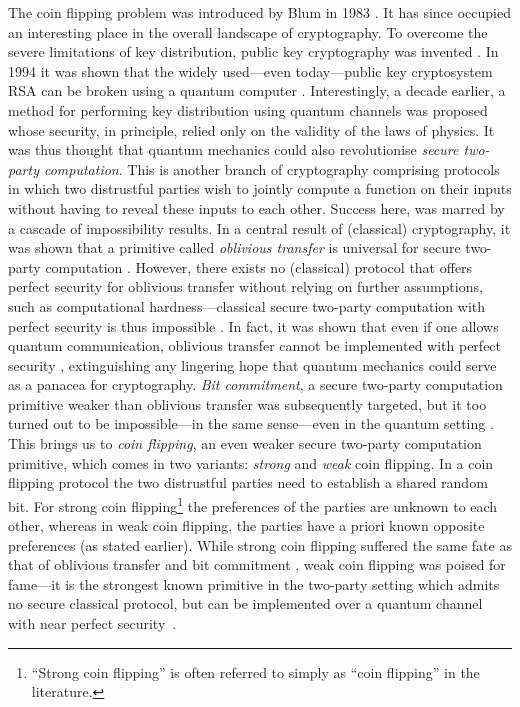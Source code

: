 \documentclass{article}
\begin{document}
%
The coin flipping problem was introduced by Blum in 1983 \cite{Blum:1983:CFT:1008908.1008911}. It has since occupied an interesting place in the overall landscape
of cryptography. To overcome the severe limitations of key distribution, public key cryptography was invented \cite{DH,Merkel}. In 1994 it was shown that the widely used---even today---public key cryptosystem RSA \cite{RSA} can be broken using a quantum computer \cite{Shora}.
Interestingly, a decade earlier, a method for performing key distribution using quantum channels
\cite{BB84} was proposed whose security, in principle, relied only
on the validity of the laws of physics. It was thus thought that quantum mechanics could also revolutionise
\emph{secure two-party computation}. This is another branch of cryptography comprising protocols in which two distrustful parties wish to jointly compute a function on their inputs without having to reveal these inputs to each other. Success here, was marred by a cascade of impossibility results. In a central result of (classical) cryptography, it was shown that a primitive called \emph{oblivious transfer} is universal for secure two-party computation \cite{Kilian}. However, there exists no (classical) protocol that offers perfect security for oblivious transfer without relying on further assumptions,
such as computational hardness---classical secure two-party computation with perfect security is thus impossible \cite{Colbeck07}. In fact, it was shown that even if one allows quantum communication, oblivious transfer cannot be implemented with perfect security \cite{Lo97,CKS13}, extinguishing any lingering hope that quantum mechanics could serve as a panacea for cryptography.
%
%
%
%
%
%
\emph{Bit commitment}, a secure two-party computation primitive weaker than oblivious transfer was subsequently targeted, but it too turned out to be impossible---in the same sense---even in the quantum setting \cite{CK11}. This brings us to \emph{coin flipping}, an even weaker secure two-party computation primitive, which comes in two variants: \emph{strong} and \emph{weak} coin flipping. In a coin flipping protocol the two distrustful parties need to establish a shared random bit. For strong coin flipping\footnote{``Strong coin flipping'' is often referred to simply as ``coin flipping'' in the literature.} the preferences of the parties are unknown to each other, whereas in weak coin flipping, the parties have a priori known opposite preferences (as stated earlier).
While strong coin flipping suffered the same fate as that of oblivious transfer and bit commitment \cite{CK09}, weak coin flipping was poised
for fame---it is the strongest known primitive in the two-party
setting which admits no secure classical protocol, but can be implemented
over a quantum channel with near perfect security~\cite{Mochon07}.
%
\end{document}
